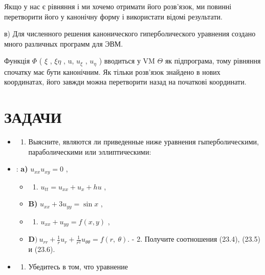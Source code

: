 \documentclass[
  ukrainian,
]{article}
\providecommand{\tightlist}{%
  \setlength{\itemsep}{0pt}\setlength{\parskip}{0pt}}
\begin{document}
Якщо у нас є рівняння і ми хочемо отримати його розв'язок, ми повинні
перетворити його у канонічну форму і використати відомі результати.

в) Для численного решения канонического гиперболического уравнения
создано много различных программ для ЭВМ.

Функція \(\Phi\) ( \(\xi\) , \(\xi \eta\) , u, \(u_{\xi}\) ,
\(u_{\eta}\) ) вводиться у VM \(\Theta\) як підпрограма, тому рівняння
спочатку має бути канонічним. Як тільки розв'язок знайдено в нових
координатах, його завжди можна перетворити назад на початкові
координати.

\section{ЗАДАЧИ}\label{ux437ux430ux434ux430ux447ux438-1}

\begin{itemize}
\tightlist
\item
  \begin{enumerate}
  \def\labelenumi{\arabic{enumi}.}
  \tightlist
  \item
    Выясните, являются ли приведенные ниже уравнения гыперболическими,
    параболическими или эллиптическими:
  \end{enumerate}
\item
  : \textbf{a)} \(u_{xx} u_{xy} = 0\) ,

  \begin{itemize}
  \tightlist
  \item
    \begin{enumerate}
    \def\labelenumi{\arabic{enumi})}
    \setcounter{enumi}{5}
    \tightlist
    \item
      \(u_{tt} = u_{xx} + u_x + hu\) ,
    \end{enumerate}
  \item
    \textbf{B)} \(u_{xx} + 3u_{yy} = \sin x\) ,
  \item
    \begin{enumerate}
    \def\labelenumi{\alph{enumi})}
    \setcounter{enumi}{17}
    \tightlist
    \item
      \(u_{xx} + u_{yy} = f(x, y)\) ,
    \end{enumerate}
  \item
    \(\mathbf{D} ) \ u_{rr} + \frac{1}{r} u_r + \frac{1}{r^2} u_{\theta \theta} = f(r, \ \theta).\)
    - 2. Получите соотношения (23.4), (23.5) и (23.6).
  \end{itemize}
\item
  \begin{enumerate}
  \def\labelenumi{\arabic{enumi}.}
  \setcounter{enumi}{2}
  \tightlist
  \item
    Убедитесь в том, что уравнение
  \end{enumerate}
\end{itemize}
\end{document}
